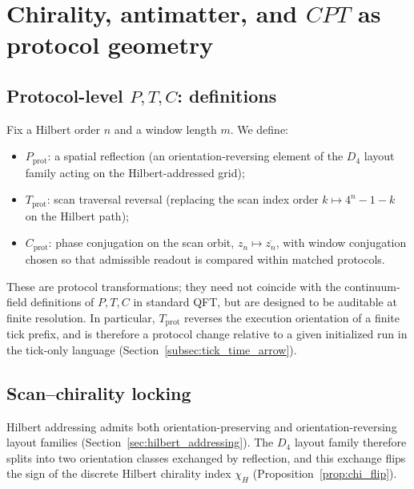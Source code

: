 
\section{Chirality, antimatter, and \texorpdfstring{$CPT$}{CPT} as protocol geometry}
\label{sec:chirality_antimatter}

\subsection{Protocol-level \texorpdfstring{$P,T,C$}{P,T,C}: definitions}
\label{subsec:ptc_definitions}

\begin{definition}\label{def:ptc_protocol}
Fix a Hilbert order $n$ and a window length $m$.
We define:
\begin{itemize}
\item $P_{\mathrm{prot}}$: a spatial reflection (an orientation-reversing element of the $D_4$ layout family acting on the Hilbert-addressed grid);
\item $T_{\mathrm{prot}}$: scan traversal reversal (replacing the scan index order $k\mapsto 4^n-1-k$ on the Hilbert path);
\item $C_{\mathrm{prot}}$: phase conjugation on the scan orbit, $z_n\mapsto \overline{z_n}$, with window conjugation chosen so that admissible readout is compared within matched protocols.
\end{itemize}
These are protocol transformations; they need not coincide with the continuum-field definitions of $P,T,C$ in standard QFT, but are designed to be auditable at finite resolution.
In particular, $T_{\mathrm{prot}}$ reverses the execution orientation of a finite tick prefix, and is therefore a protocol change relative to a given initialized run in the tick-only language (Section~\ref{subsec:tick_time_arrow}).
\end{definition}

\subsection{Scan--chirality locking}
\label{subsec:scl}

Hilbert addressing admits both orientation-preserving and orientation-reversing layout families (Section~\ref{sec:hilbert_addressing}).
The $D_4$ layout family therefore splits into two orientation classes exchanged by reflection, and this exchange flips the sign of the discrete Hilbert chirality index $\chi_H$ (Proposition~\ref{prop:chi_flip}).

